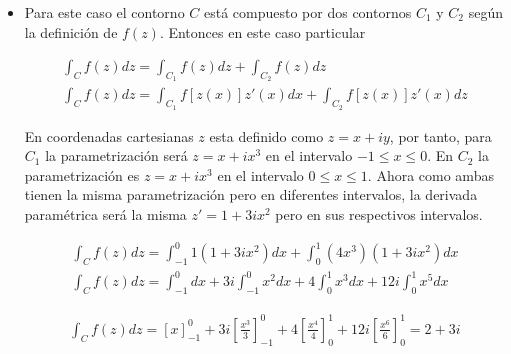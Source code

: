 \begin{itemize}
    \item Para este caso el contorno $C$ está compuesto por dos contornos $C_1$ y $C_2$ según la definición de $f(z)$. Entonces en este caso particular 
    
    \begin{gather*}
        \int_C f(z)dz = \int_{C_1} f(z)dz + \int_{C_2}  f(z)dz\\
        \int_C f(z)dz = \int_{C_1} f[z(x)]z'(x)dx + \int_{C_2}  f[z(x)]z'(x)dz
    \end{gather*}

    En coordenadas cartesianas $z$ esta definido como $z = x + iy$, por tanto, para $C_1$ la parametrización será $z = x + ix^3$ en el intervalo $-1 \leq x \leq 0$. En $C_2$ la parametrización es $z = x + ix^3$ en el intervalo $0 \leq x \leq 1$. Ahora como ambas tienen la misma parametrización pero en diferentes intervalos, la derivada paramétrica será la misma $z' = 1 + 3ix^2$ pero en sus respectivos intervalos. 


    \begin{gather*}
        \int_C f(z)dz = \int_{-1}^{0} 1(1 + 3ix^2)dx + \int_0^{1}(4x^3)(1+3ix^2)dx\\
        \int_C f(z)dz = \int_{-1}^{0} dx + 3i\int_{-1}^{0}x^2dx + 4\int_0^{1}x^3dx +   12i\int_0^{1}x^5dx
    \end{gather*}

    \begin{mdframed}
        \vspace{-0.25cm}
        \begin{gather}
            \int_C f(z)dz = \left[x\right]_{-1}^{0} + 3i\left[\frac{x^3}{3}\right]_{-1}^{0} + 4\left[\frac{x^4}{4}\right]_0^{1} +   12i\left[\frac{x^6}{6}\right]_0^{1} = 2 + 3i
        \end{gather}    
        \vspace{-0.3cm}
    \end{mdframed}
    
\end{itemize}